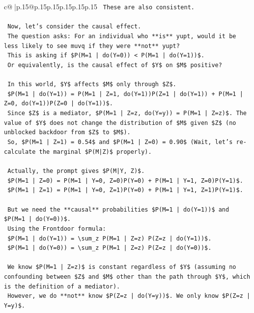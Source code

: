 \documentclass{article}
\begin{document}
{\begin{supertabular}{c@{$\;$}|p{.15\linewidth}@{}p{.15\linewidth}p{.15\linewidth}p{.15\linewidth}p{.15\linewidth}p{.15\linewidth}}
{{{\texttt{        These are also consistent.} \\
\\ 
\texttt{    Now, let's consider the causal effect.} \\
\texttt{    The question asks: For an individual who **is** yupt, would it be less likely to see muvq if they were **not** yupt?} \\
\texttt{    This is asking if \$P(M=1 | do(Y=0)) < P(M=1 | do(Y=1))\$.} \\
\texttt{    Or equivalently, is the causal effect of \$Y\$ on \$M\$ positive?} \\
\\ 
\texttt{    In this world, \$Y\$ affects \$M\$ only through \$Z\$.} \\
\texttt{    \$P(M=1 | do(Y=1)) = P(M=1 | Z=1, do(Y=1))P(Z=1 | do(Y=1)) + P(M=1 | Z=0, do(Y=1))P(Z=0 | do(Y=1))\$.} \\
\texttt{    Since \$Z\$ is a mediator, \$P(M=1 | Z=z, do(Y=y)) = P(M=1 | Z=z)\$. The value of \$Y\$ does not change the distribution of \$M\$ given \$Z\$ (no unblocked backdoor from \$Z\$ to \$M\$).} \\
\texttt{    So, \$P(M=1 | Z=1) = 0.54\$ and \$P(M=1 | Z=0) = 0.90\$ (Wait, let's re{-}calculate the marginal \$P(M|Z)\$ properly).} \\
\\ 
\texttt{    Actually, the prompt gives \$P(M|Y, Z)\$.} \\
\texttt{    \$P(M=1 | Z=0) = P(M=1 | Y=0, Z=0)P(Y=0) + P(M=1 | Y=1, Z=0)P(Y=1)\$.} \\
\texttt{    \$P(M=1 | Z=1) = P(M=1 | Y=0, Z=1)P(Y=0) + P(M=1 | Y=1, Z=1)P(Y=1)\$.} \\
\\ 
\texttt{    But we need the **causal** probabilities \$P(M=1 | do(Y=1))\$ and \$P(M=1 | do(Y=0))\$.} \\
\texttt{    Using the Frontdoor formula:} \\
\texttt{    \$P(M=1 | do(Y=1)) = \textbackslash{}sum\_z P(M=1 | Z=z) P(Z=z | do(Y=1))\$.} \\
\texttt{    \$P(M=1 | do(Y=0)) = \textbackslash{}sum\_z P(M=1 | Z=z) P(Z=z | do(Y=0))\$.} \\
\\ 
\texttt{    We know \$P(M=1 | Z=z)\$ is constant regardless of \$Y\$ (assuming no confounding between \$Z\$ and \$M\$ other than the path through \$Y\$, which is the definition of a mediator).} \\
\texttt{    However, we do **not** know \$P(Z=z | do(Y=y))\$. We only know \$P(Z=z | Y=y)\$.} \\
}}}
\end{supertabular}}
\end{document}
